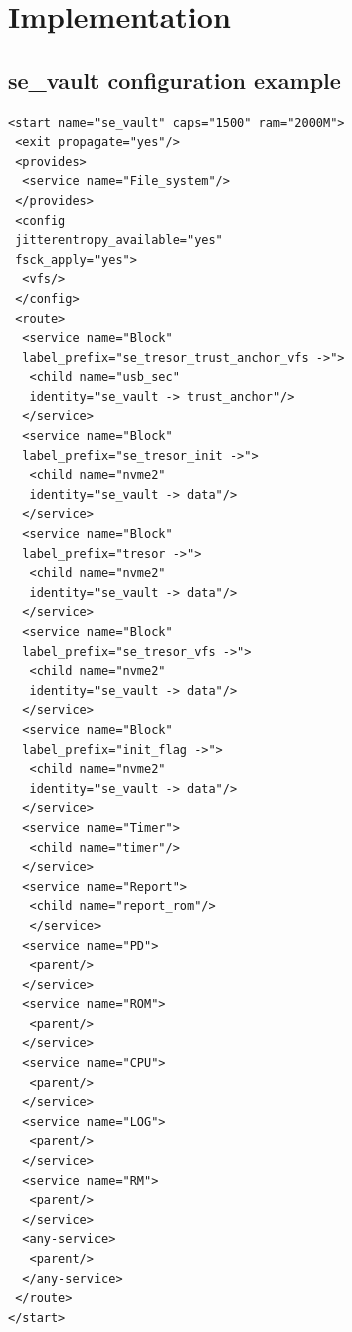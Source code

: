 \appendix

\chapter{Implementation}
\section{se\_vault configuration example}

\begin{lstlisting}[breaklines=true]
<start name="se_vault" caps="1500" ram="2000M">
 <exit propagate="yes"/>
 <provides>
  <service name="File_system"/>
 </provides>
 <config
 jitterentropy_available="yes"
 fsck_apply="yes">
  <vfs/>
 </config>
 <route>
  <service name="Block"
  label_prefix="se_tresor_trust_anchor_vfs ->"> 
   <child name="usb_sec"
   identity="se_vault -> trust_anchor"/> 
  </service>
  <service name="Block"
  label_prefix="se_tresor_init ->">
   <child name="nvme2"
   identity="se_vault -> data"/>
  </service>
  <service name="Block"
  label_prefix="tresor ->">
   <child name="nvme2"
   identity="se_vault -> data"/>
  </service>
  <service name="Block"
  label_prefix="se_tresor_vfs ->">
   <child name="nvme2"
   identity="se_vault -> data"/>
  </service>
  <service name="Block"
  label_prefix="init_flag ->">
   <child name="nvme2"
   identity="se_vault -> data"/>
  </service>
  <service name="Timer">
   <child name="timer"/>
  </service>
  <service name="Report">
   <child name="report_rom"/>
   </service>
  <service name="PD">
   <parent/>
  </service>
  <service name="ROM">
   <parent/>
  </service>
  <service name="CPU">
   <parent/>
  </service>
  <service name="LOG">
   <parent/>
  </service>
  <service name="RM">
   <parent/>
  </service>
  <any-service>
   <parent/>
  </any-service>
 </route>
</start>
\end{lstlisting}
